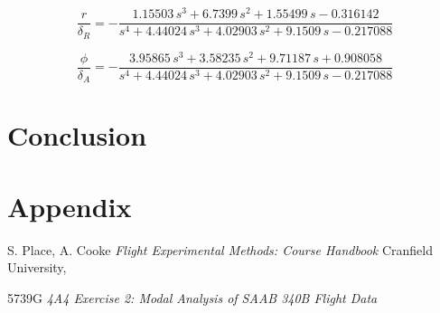 \documentclass{article}
\begin{document}
\begin{equation}
    \frac{r}{\delta_R} =
    -\frac{1.15503\,s^3+6.7399\,s^2+1.55499\,s-0.316142}{s^4+4.44024\,s^3+4.02903\,s^2+9.1509\,s-0.217088}
\end{equation}

\begin{equation}
    \frac{\phi}{\delta_A} =
    -\frac{3.95865\,s^3+3.58235\,s^2+9.71187\,s+0.908058}{s^4+4.44024\,s^3+4.02903\,s^2+9.1509\,s-0.217088}
\end{equation}

\section{Conclusion}

\section{Appendix}

\begin{thebibliography}{9}

  S. Place, A. Cooke
  \emph{Flight Experimental Methods: Course Handbook}
  Cranfield University,

    5739G
    \emph{4A4 Exercise 2: Modal Analysis of SAAB 340B Flight Data}

\end{thebibliography}
\end{document}
